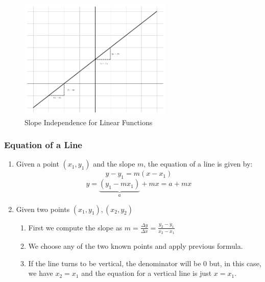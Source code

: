 \documentclass[a4paper,11pt]{article}
\theoremstyle{definition}
\theoremstyle{plain}
\begin{document}
    \begin{figure}[htbp]
    	\centering 
    		\includegraphics[width = 0.65\textwidth]{Ch1_files/Ch1_6_0.png}
    		\caption{Slope Independence for Linear Functions}
    		\label{fig:independence_slope}
    \end{figure}

\subsubsection{Equation of a Line}\label{equation-of-a-line}

\begin{enumerate}
\def\labelenumi{\arabic{enumi}.}
\item
  Given a point \((x_1, y_1)\) and the slope \(m\), the equation of a
  line is given by: \[
  y - y_1 = m(x - x_1)
  \] 
  \[
  y = \underset{a}{\underbrace{(y_1 - m x_1)}} + m x = a + mx
  \]
\item

 Given two points \((x_1,y_1),(x_2, y_2)\)

  \begin{enumerate}
  \def\labelenumii{\arabic{enumii}.}
 
   \item
    First we compute the slope as
    \(m = \frac{\Delta y}{\Delta x} = \frac{y_2 - y_1}{x_2 - x_1}\)
  \item
    We choose any of the two known points and apply previous formula.
  \item
    If the line turns to be vertical, the denominator will be \(0\) but,
    in this case, we have \(x_2 = x_1\) and the equation for a vertical
    line is just \(x = x_1\).
  \end{enumerate}
\end{enumerate}
\end{document}
